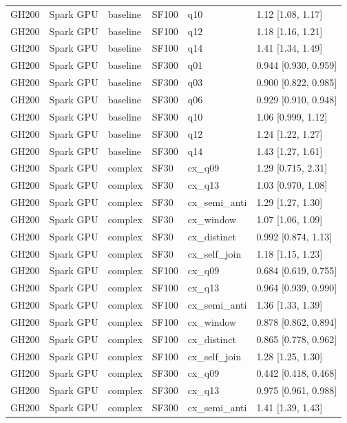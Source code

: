 \begin{longtable}{llllll}
GH200 & Spark GPU & baseline & SF100 & q10 & 1.12 [1.08, 1.17] \\
GH200 & Spark GPU & baseline & SF100 & q12 & 1.18 [1.16, 1.21] \\
GH200 & Spark GPU & baseline & SF100 & q14 & 1.41 [1.34, 1.49] \\
GH200 & Spark GPU & baseline & SF300 & q01 & 0.944 [0.930, 0.959] \\
GH200 & Spark GPU & baseline & SF300 & q03 & 0.900 [0.822, 0.985] \\
GH200 & Spark GPU & baseline & SF300 & q06 & 0.929 [0.910, 0.948] \\
GH200 & Spark GPU & baseline & SF300 & q10 & 1.06 [0.999, 1.12] \\
GH200 & Spark GPU & baseline & SF300 & q12 & 1.24 [1.22, 1.27] \\
GH200 & Spark GPU & baseline & SF300 & q14 & 1.43 [1.27, 1.61] \\
GH200 & Spark GPU & complex & SF30 & cx\_q09 & 1.29 [0.715, 2.31] \\
GH200 & Spark GPU & complex & SF30 & cx\_q13 & 1.03 [0.970, 1.08] \\
GH200 & Spark GPU & complex & SF30 & cx\_semi\_anti & 1.29 [1.27, 1.30] \\
GH200 & Spark GPU & complex & SF30 & cx\_window & 1.07 [1.06, 1.09] \\
GH200 & Spark GPU & complex & SF30 & cx\_distinct & 0.992 [0.874, 1.13] \\
GH200 & Spark GPU & complex & SF30 & cx\_self\_join & 1.18 [1.15, 1.23] \\
GH200 & Spark GPU & complex & SF100 & cx\_q09 & 0.684 [0.619, 0.755] \\
GH200 & Spark GPU & complex & SF100 & cx\_q13 & 0.964 [0.939, 0.990] \\
GH200 & Spark GPU & complex & SF100 & cx\_semi\_anti & 1.36 [1.33, 1.39] \\
GH200 & Spark GPU & complex & SF100 & cx\_window & 0.878 [0.862, 0.894] \\
GH200 & Spark GPU & complex & SF100 & cx\_distinct & 0.865 [0.778, 0.962] \\
GH200 & Spark GPU & complex & SF100 & cx\_self\_join & 1.28 [1.25, 1.30] \\
GH200 & Spark GPU & complex & SF300 & cx\_q09 & 0.442 [0.418, 0.468] \\
GH200 & Spark GPU & complex & SF300 & cx\_q13 & 0.975 [0.961, 0.988] \\
GH200 & Spark GPU & complex & SF300 & cx\_semi\_anti & 1.41 [1.39, 1.43] \\

\end{longtable}
